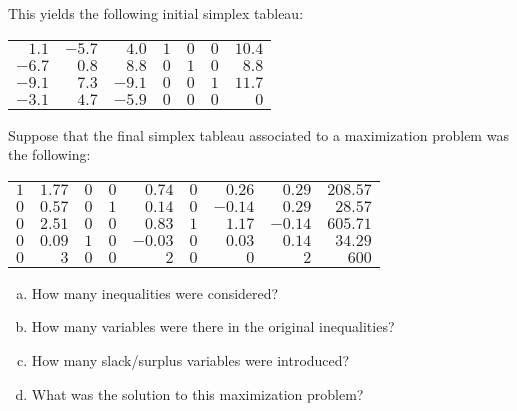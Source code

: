 \documentclass[11pt,letterpaper]{article}
\begin{document}
This yields the following initial simplex tableau: \par
	\begin{table}[!ht]
	\centering
	\begin{tabular}{rrrrrr|r}
	$1.1$ & $-5.7$ & $4.0$ & $1$ & $0$ & $0$ & $10.4$ \\ 
	$-6.7$ & $0.8$ & $8.8$ & $0$ & $1$ & $0$ & $8.8$ \\ 
	$-9.1$ & $7.3$ & $-9.1$ & $0$ & $0$ & $1$ & $11.7$ \\ \hline
	$-3.1$ & $4.7$ & $-5.9$ & $0$ & $0$ & $0$ & $0$ \\ 
	\end{tabular}
	\end{table}



\newpage



 Suppose that the final simplex tableau associated to a maximization problem was the following: \par
	\begin{table}[!ht]
	\centering
	\begin{tabular}{rrrrrrrrr}
	$1$ & $1.77$ & $0$ & $0$ & $0.74$ & $0$ & $0.26$ & $0.29$ & $208.57$ \\
	$0$ & $0.57$ & $0$ & $1$ & $0.14$ & $0$ & $-0.14$ & $0.29$ & $28.57$ \\
	$0$ & $2.51$ & $0$ & $0$ & $0.83$ & $1$ & $1.17$ & $-0.14$ & $605.71$ \\
	$0$ & $0.09$ & $1$ & $0$ & $-0.03$ & $0$ & $0.03$ & $0.14$ & $34.29$ \\
	$0$ & $3$ & $0$& $0$& $2$ & $0$ & $0$ & $2$ & $600$
	\end{tabular}
	\end{table} \par

\begin{enumerate}[(a)]
\item How many inequalities were considered?
\item How many variables were there in the original inequalities?
\item How many slack/surplus variables were introduced?
\item What was the solution to this maximization problem?
\end{enumerate} \pspace
\end{document}
